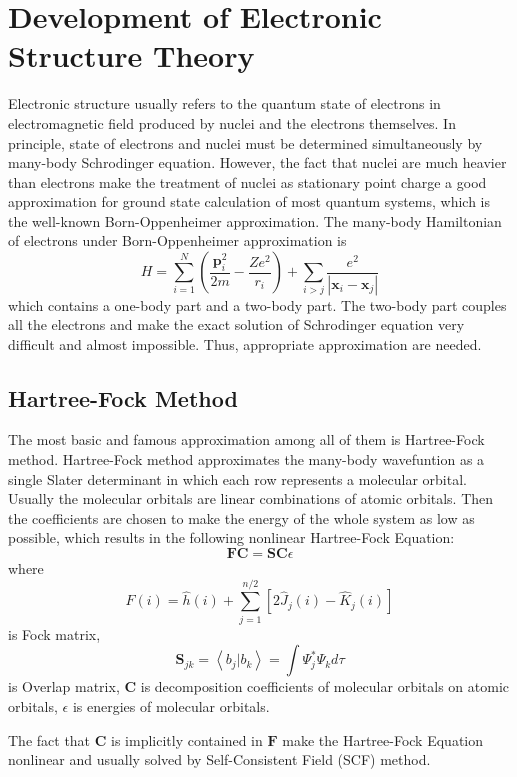 \chapter{Development of Electronic Structure Theory}
Electronic structure usually refers to the quantum state of electrons in electromagnetic field produced by nuclei and the electrons themselves.\cite{elecstruc}
In principle, state of electrons and nuclei must be determined simultaneously by many-body Schrodinger equation.
However, the fact that nuclei are much heavier than electrons make the treatment of nuclei as stationary point charge a good approximation for ground state calculation of most quantum systems, which is the well-known Born-Oppenheimer approximation.\cite{sakurai}
The many-body Hamiltonian of electrons under Born-Oppenheimer approximation is
$$
H=\sum_{i=1}^{N}\left(\frac{\boldsymbol{p}_{i}^{2}}{2 m}-\frac{Z e^{2}}{r_{i}}\right)+\sum_{i>j} \frac{e^{2}}{\left|\boldsymbol{x}_{i}-\boldsymbol{x}_{j}\right|}
$$
which contains a one-body part and a two-body part.
The two-body part couples all the electrons and make the exact solution of Schrodinger equation very difficult and almost impossible.
Thus, appropriate approximation are needed.


\section{Hartree-Fock Method}
The most basic and famous approximation among all of them is Hartree-Fock method.\cite{hartree}
Hartree-Fock method approximates the many-body wavefuntion as a single Slater determinant in which each row represents a molecular orbital. 
Usually the molecular orbitals are linear combinations of atomic orbitals. 
Then the coefficients are chosen to make the energy of the whole system as low as possible, which results in the following nonlinear Hartree-Fock Equation:
$$
\mathbf{F} \mathbf{C}=\mathbf{S} \mathbf{C} \epsilon
$$
where
$$
\hat{F}(i)=\hat{h}(i)+\sum_{j=1}^{n / 2}\left[2 \hat{J}_{j}(i)-\hat{K}_{j}(i)\right]
$$
is Fock matrix, 
$$
\mathbf{S}_{j k}=\left\langle b_{j} | b_{k}\right\rangle=\int \Psi_{j}^{*} \Psi_{k} d \tau
$$
is Overlap matrix,
$\mathbf{C}$ is decomposition coefficients of molecular orbitals on atomic orbitals,
$\epsilon$ is energies of molecular orbitals.

The fact that $\mathbf{C}$ is implicitly contained in $\mathbf{F}$ make the Hartree-Fock Equation nonlinear and usually solved by Self-Consistent Field (SCF) method.

